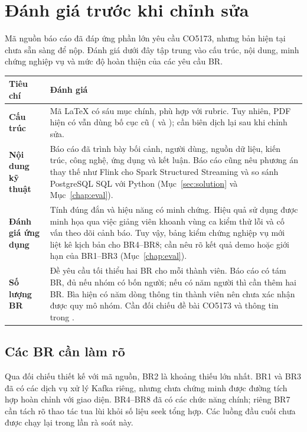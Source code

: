 \section*{Đánh giá trước khi chỉnh sửa}

Mã nguồn báo cáo đã đáp ứng phần lớn yêu cầu CO5173, nhưng bản hiện tại
chưa sẵn sàng để nộp. Đánh giá dưới đây tập trung vào cấu trúc, nội dung,
minh chứng nghiệp vụ và mức độ hoàn thiện của các yêu cầu BR.

\begin{table}[htbp]
\centering
\small
\begin{tabularx}{\textwidth}{@{}>{\bfseries}p{}Y@{}}
\toprule
Tiêu chí & Đánh giá \\
\midrule
Cấu trúc &
Mã LaTeX có sáu mục chính, phù hợp với rubric. Tuy nhiên, PDF hiện có vẫn
dùng bố cục cũ ( và ); cần biên dịch lại sau
khi chỉnh sửa. \\
Nội dung kỹ thuật &
Báo cáo đã trình bày bối cảnh, người dùng, nguồn dữ liệu, kiến trúc, công
nghệ, ứng dụng và kết luận. Báo cáo cũng nêu phương án thay thế như Flink
cho Spark Structured Streaming và so sánh PostgreSQL SQL với Python
(Mục~\ref{sec:solution} và Mục~\ref{chap:eval}). \\
Đánh giá ứng dụng &
Tính đúng đắn và hiệu năng có minh chứng. Hiệu quả sử dụng được minh họa
qua việc giảng viên khoanh vùng ca kiểm thử lỗi và cố vấn theo dõi cảnh báo.
Tuy vậy, bảng kiểm chứng nghiệp vụ mới liệt kê kịch bản cho BR4--BR8; cần
nêu rõ kết quả demo hoặc giới hạn của BR1--BR3 (Mục~\ref{chap:eval}). \\
Số lượng BR &
Đề yêu cầu tối thiểu hai BR cho mỗi thành viên. Báo cáo có tám BR, đủ nếu
nhóm có bốn người; nếu có năm người thì cần thêm hai BR. Bìa hiện có năm
dòng thông tin thành viên nên chưa xác nhận được quy mô nhóm. Cần đối chiếu
đề bài CO5173 và thông tin trong . \\
\bottomrule
\end{tabularx}
\end{table}

\subsection*{Các BR cần làm rõ}

Qua đối chiếu thiết kế với mã nguồn, BR2 là khoảng thiếu lớn nhất. BR1 và
BR3 đã có các dịch vụ xử lý Kafka riêng, nhưng chưa chứng minh được đường
tích hợp hoàn chỉnh với giao diện. BR4--BR8 đã có các chức năng chính; riêng
BR7 cần tách rõ thao tác tua lùi khỏi số liệu seek tổng hợp. Các luồng đầu
cuối chưa được chạy lại trong lần rà soát này.

